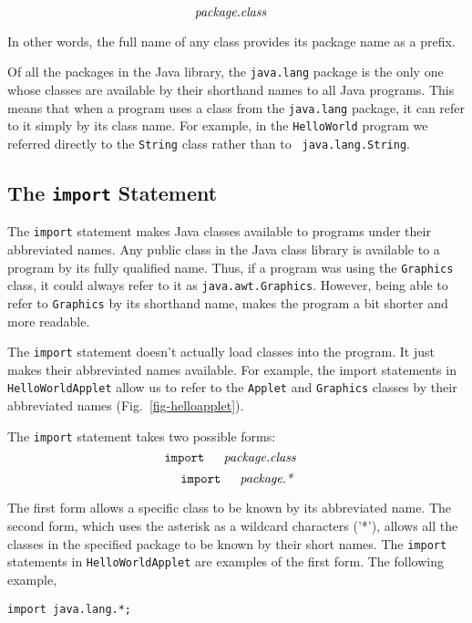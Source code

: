 $$
\hbox{\it package.class}\quad
$$

\noindent In other words, the full name of any class provides
its package name as a prefix.

Of all the packages in the Java library, the {\tt java.lang} package
is the only one whose classes are available by their shorthand names
to all Java programs. This means that when a program uses a class from
the {\tt java.lang} package, it can refer to it simply by its class
name. For example, in the {\tt HelloWorld} program we referred
directly to the {\tt String} class rather than to {\tt
java.lang.String}.

\subsection{The {\tt import} Statement}

The {\tt import} statement makes Java classes available to programs
under their abbreviated names. Any public class in the Java class
library is available to a program by its fully qualified name.  Thus,
if a program was using the {\tt Graphics} class, it could always refer
to it as {\tt java.awt.Graphics}.  However, being able to refer to
{\tt Graphics} by its shorthand name, makes the program a bit
shorter and more readable.

The {\tt import} statement doesn't actually load classes into the
program. It just makes their abbreviated names available.  For
example, the import statements in {\tt HelloWorldApplet} allow us to
refer to the {\tt Applet} and {\tt Graphics} classes by their
abbreviated names (Fig.~\ref{fig-helloapplet}).

The {\tt import} statement takes two possible forms:
$$
\hbox{\tt import }\quad
\hbox{\it package.class}\quad
$$
$$
\hbox{\tt import }\quad
\hbox{\it package.*}\quad\\
$$

\noindent The first form allows a specific class to be known
by its abbreviated name. The second form, which uses the asterisk as a
wildcard characters ('*'), allows all the classes in the specified
package to be known by their short names. The {\tt import} statements
in {\tt HelloWorldApplet} are examples of the first form. The
following example,

\begin{jjjlisting}
\begin{lstlisting}
import java.lang.*;
\end{lstlisting}
\end{jjjlisting}

